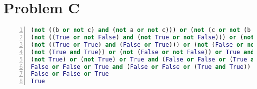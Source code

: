 \documentclass{article}
\begin{document}
\section*{Problem C}
\begin{lstlisting}[language=Python, breaklines=True, numbers=left]
(not ((b or not c) and (not a or not c))) or (not (c or not (b and c))) or (a and not c) and (not a or (a and b and c) or (a and ((b and not c) or (not b))))
(not ((True or not False) and (not True or not False))) or (not (False or not (True and False))) or (True and not False) and (not True or (True and True and False) or (True and ((True and not False) or (not True))))
(not ((True or True) and (False or True))) or (not (False or not (True and False))) or (True and True) and (False or (True and True and False) or (True and ((True and True) or False)))
(not (True and True)) or (not (False or not False)) or True and (False or False or (True and (True or False)))
(not True) or (not True) or True and (False or False or (True and True))
False or False or True and (False or False or (True and True))
False or False or True
True
\end{lstlisting}
\end{document}
